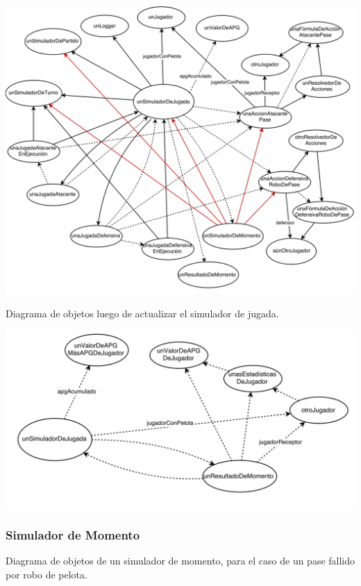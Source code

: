 \begin{center}
\includegraphics[width=15cm]{diagramas/DO6}
\end{center}

Diagrama de objetos luego de actualizar el simulador de jugada.

\begin{center}
\includegraphics[width=15cm]{diagramas/DO7}
\end{center}

\subsubsection{Simulador de Momento}

Diagrama de objetos de un simulador de momento, para el caso de un pase fallido por robo de pelota.

